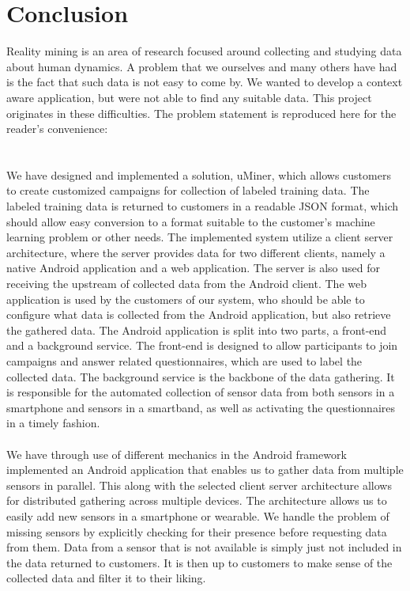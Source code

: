 
\chapter{Conclusion}
\label{cha:conclusion}
Reality mining is an area of research focused around collecting and studying data about human dynamics. A problem that we ourselves and many others have had is the fact that such data is not easy to come by. We wanted to develop a context aware application, but were not able to find any suitable data. This project originates in these difficulties. The problem statement is reproduced here for the reader's convenience:
\\

\\\\
We have designed and implemented a solution, uMiner, which allows customers to create customized campaigns for collection of labeled training data. The labeled training data is returned to customers in a readable JSON format, which should allow easy conversion to a format suitable to the customer's machine learning problem or other needs. The implemented system utilize a client server architecture, where the server provides data for two different clients, namely a native Android application and a web application. The server is also used for receiving the upstream of collected data from the Android client. The web application is used by the customers of our system, who should be able to configure what data is collected from the Android application, but also retrieve the gathered data. The Android application is split into two parts, a front-end and a background service. The front-end is designed to allow participants to join campaigns and answer related questionnaires, which are used to label the collected data. The background service is the backbone of the data gathering. It is responsible for the automated collection of sensor data from both sensors in a smartphone and sensors in a smartband, as well as activating the questionnaires in a timely fashion.  
\\\\
We have through use of different mechanics in the Android framework implemented an Android application that enables us to gather data from multiple sensors in parallel. This along with the selected client server architecture allows for distributed gathering across multiple devices. The architecture allows us to easily add new sensors in a smartphone or wearable. We handle the problem of missing sensors by explicitly checking for their presence before requesting data from them. Data from a sensor that is not available is simply just not included in the data returned to customers. It is then up to customers to make sense of the collected data and filter it to their liking.
